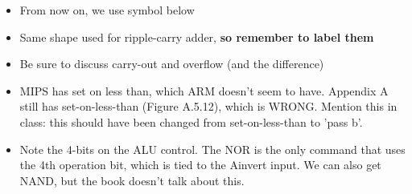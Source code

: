 \begin{frame}[fragile]
\begin{itemize}


\item From now on, we use symbol below
\item Same shape used for ripple-carry adder, \textbf{so remember to label them}
\end{itemize}

\BNotes\ifnum{}
\begin{itemize}
\item Be sure to discuss carry-out and overflow (and the difference)
\item MIPS has set on less than, which ARM doesn't seem to have.  Appendix A
  still has set-on-less-than (Figure A.5.12), which is WRONG.  Mention this in
  class: this should have been changed from set-on-less-than to 'pass b'.
\item Note the 4-bits on the ALU control.  The NOR is the only command that
  uses the 4th operation bit, which is tied to the Ainvert input.  We can
  also get NAND, but the book doesn't talk about this.
\end{itemize}
\fi\ENotes
\end{frame}


   


